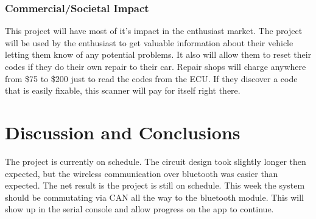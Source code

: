 \documentclass[12pt,letterpaper]{article}
\begin{document}
\subsubsection{Commercial/Societal Impact}
This project will have most of it's impact in the enthusiast market. The project will be used by the enthusiast to get valuable information about their vehicle letting them know of any potential problems. It also will allow them to reset their codes if they do their own repair to their car. Repair shops will charge anywhere from \$75 to \$200 just to read the codes from the ECU. If they discover a code that is easily fixable, this scanner will pay for itself right there.

\newpage

\section{Discussion and Conclusions}
The project is currently on schedule. The circuit design took slightly longer then expected, but the wireless communication over bluetooth was easier than expected. The net result is the project is still on schedule. This week the system should be commutating via CAN all the way to the bluetooth module. This will show up in the serial console and allow progress on the app to continue. 

\newpage
\end{document}
